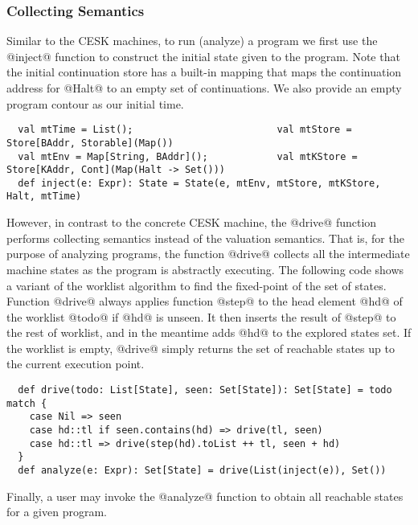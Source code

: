 \documentclass[acmsmall, review]{acmart}\settopmatter{}
\begin{document}
\subsubsection{Collecting Semantics}

Similar to the CESK machines, to run (analyze) a program we first use the @inject@ function
to construct the initial state given to the program. Note that the initial continuation store
has a built-in mapping that maps the continuation address for @Halt@ to an empty set of 
continuations. We also provide an empty program contour as our initial time.

\begin{lstlisting}
  val mtTime = List();                         val mtStore = Store[BAddr, Storable](Map())
  val mtEnv = Map[String, BAddr]();            val mtKStore = Store[KAddr, Cont](Map(Halt -> Set()))
  def inject(e: Expr): State = State(e, mtEnv, mtStore, mtKStore, Halt, mtTime)
\end{lstlisting}

However, in contrast to the concrete CESK machine, the @drive@ function performs 
collecting semantics instead of the valuation semantics. That is, for the purpose of
analyzing programs, the function @drive@ collects all the intermediate machine states 
as the program is abstractly executing. The following code shows a variant of the 
worklist algorithm to find the fixed-point of the set of states.
Function @drive@ always applies function @step@ to the head element @hd@ of
the worklist @todo@ if @hd@ is unseen. It then inserts the result of @step@ to
the rest of worklist, and in the meantime adds @hd@ to the explored states set.
If the worklist is empty, @drive@ simply returns the set of reachable states
up to the current execution point.

\begin{lstlisting}
  def drive(todo: List[State], seen: Set[State]): Set[State] = todo match {
    case Nil => seen
    case hd::tl if seen.contains(hd) => drive(tl, seen)
    case hd::tl => drive(step(hd).toList ++ tl, seen + hd)
  }
  def analyze(e: Expr): Set[State] = drive(List(inject(e)), Set())
\end{lstlisting}

Finally, a user may invoke the @analyze@ function to obtain all reachable states for 
a given program.

\end{document}
